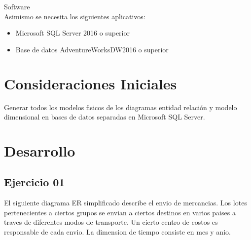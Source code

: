 \documentclass[12pt,letterpaper]{article}
\begin{document}
Software
\\
Asimismo se necesita los siguientes aplicativos:
	\begin{itemize}
	\item Microsoft SQL Server 2016 o superior
	\item Base de datos AdventureWorksDW2016 o superior
	\end{itemize}


\section{Consideraciones Iniciales}
Generar todos los modelos fisicos de los diagramas entidad relación y modelo dimensional en bases de datos
separadas en Microsoft SQL Server.

\section{Desarrollo}

\subsection{\textbf{Ejercicio 01}}
El siguiente diagrama ER simplificado describe el envio de mercancias. Los lotes pertenecientes a ciertos grupos se
envian a ciertos destinos en varios paises a traves de diferentes modos de transporte. Un cierto centro de costos es
responsable de cada envio. La dimension de tiempo consiste en mes y anio.





\end{document}
